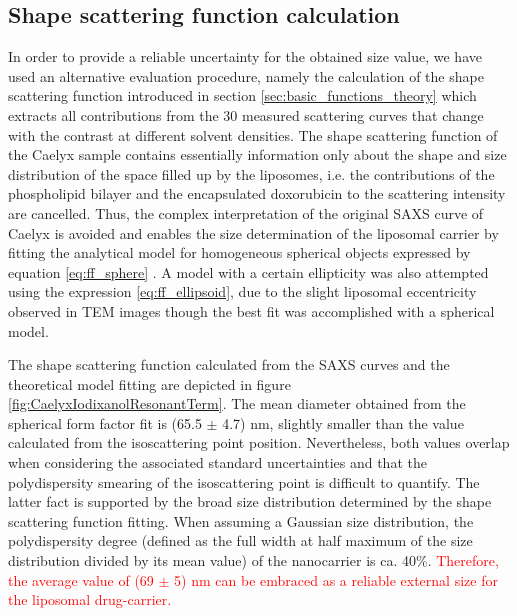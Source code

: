 \subsection{Shape scattering function calculation}
In order to provide a reliable uncertainty for the obtained size value, we have used an alternative evaluation procedure, namely the calculation of the shape scattering function introduced in section \ref{sec:basic_functions_theory} which extracts all contributions from the 30 measured scattering curves that change with the contrast at different solvent densities. The shape scattering function of the Caelyx sample contains essentially information only about the shape and size distribution of the space filled up by the liposomes, i.e. the contributions of the phospholipid bilayer and the encapsulated doxorubicin to the scattering intensity are cancelled. Thus, the complex interpretation of the original SAXS curve of Caelyx is avoided and enables the size determination of the liposomal carrier by fitting the analytical model for homogeneous spherical objects expressed by equation \ref{eq:ff_sphere} . A model with a certain ellipticity was also attempted using the expression \ref{eq:ff_ellipsoid}, due to the slight liposomal eccentricity observed in TEM images \citep{barenholz_doxil-first_2012} though the best fit was accomplished with a spherical model. 

%		

The shape scattering function calculated from the SAXS curves and the theoretical model fitting are depicted in figure \ref{fig:CaelyxIodixanolResonantTerm}. The mean diameter obtained from the spherical form factor fit is (65.5 $\pm$ 4.7) nm, slightly smaller than the value calculated from the isoscattering point position. Nevertheless, both values overlap when considering the associated standard uncertainties and that the polydispersity smearing of the isoscattering point is difficult to quantify. The latter fact is supported by the broad size distribution determined by the shape scattering function fitting. When assuming a Gaussian size distribution, the polydispersity degree (defined as the full width at half maximum of the size distribution divided by its mean value) of the nanocarrier is ca. 40$\%$. \textcolor{red}{Therefore, the average value of (69 $\pm$ 5) nm can be embraced as a reliable external size for the liposomal drug-carrier.}

